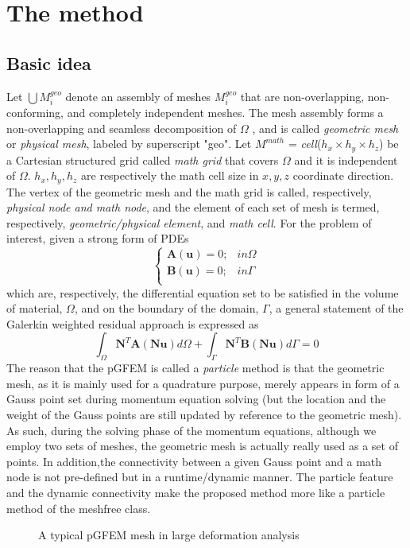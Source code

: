 \documentclass{acm_proc_article-sp}
\begin{document}
\section{The method}
\subsection{Basic idea}
Let $\bigcup M_i^{geo}$ denote an assembly of meshes $M_i^{geo}$ that are non-overlapping, non-conforming, and completely independent meshes. The mesh assembly forms a non-overlapping and seamless
decomposition of $\Omega$ , and is called \emph{geometric mesh} or \emph{physical mesh}, labeled by superscript "geo". Let $M^{math}$ = {\emph{cell}($h_x \times h_y \times h_z$)} be a Cartesian structured grid called \emph{math grid} that covers $\Omega$ and it is independent of $\Omega$. $h_x, h_y, h_z$ are respectively the math cell size in $x, y, z$ coordinate direction. The vertex of the geometric mesh and the math grid is called, respectively, \emph{physical node and math node}, and the element of each set of mesh is termed, respectively, \emph{geometric/physical element}, and \emph{math cell}.
For the problem of interest, given a strong form of PDEs
\begin{equation}
\begin{cases}
  	   \textbf{A}(\textbf{u})=0; &in  \Omega\\
       \textbf{B}(\textbf{u})=0; &in  \Gamma\\  
\end{cases}
\end{equation}
which are, respectively, the differential equation set to be satisfied in the volume of material, $\Omega$, and on the boundary of the domain, $\Gamma$, a general statement of the Galerkin weighted residual approach is expressed as
\begin{equation}
\int_{\Omega}\textbf{N}^T\textbf{A}(\textbf{Nu})d\Omega + \int_{\Gamma}\textbf{N}^T\textbf{B}(\textbf{Nu})d\Gamma = 0  
\end{equation}
The reason that the pGFEM is called a \emph{particle} method is that the geometric mesh, as it is mainly used for a quadrature purpose, merely appears in form of a Gauss point set during momentum equation solving (but the location and the weight of the Gauss points are still updated by reference to the geometric mesh). As such, during the solving phase of the momentum equations, although we employ two sets of meshes, the geometric mesh is actually really used as a set of points. In addition,the connectivity between a given Gauss point and a math node is not pre-defined but in a runtime/dynamic manner. The particle feature and the dynamic connectivity make the proposed method more like a particle method of the meshfree class.\cite{bramms:babel}
\begin{figure}
\centering
{}
\caption{A typical pGFEM mesh in large deformation analysis}
\end{figure}
\end{document}
